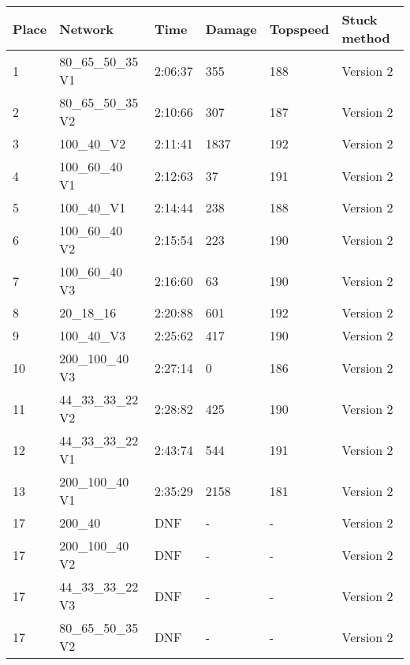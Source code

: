 \begin{table}[H]
\begin{tabular}{llllll}
 \textbf{Place} & \textbf{Network} & \textbf{Time} & \textbf{Damage} & \textbf{Topspeed}  & \textbf{Stuck method} \\ \hline
 1&  80\_65\_50\_35 V1 & 2:06:37 & 355 & 188 & Version 2 \\ \hline
 2& 80\_65\_50\_35 V2  & 2:10:66 & 307 & 187 & Version 2 \\ \hline
 3&  100\_40\_V2 & 2:11:41 & 1837 & 192 & Version 2 \\ \hline
 4& 100\_60\_40 V1 & 2:12:63 & 37 & 191 & Version 2   \\ \hline
 5&  100\_40\_V1  & 2:14:44 & 238 & 188 & Version 2 \\ \hline
 6& 100\_60\_40 V2  & 2:15:54 & 223 & 190 & Version 2 \\ \hline
 7& 100\_60\_40 V3 & 2:16:60  & 63 & 190 & Version 2   \\ \hline
 8& 20\_18\_16  & 2:20:88  & 601 & 192 & Version 2    \\
 9& 100\_40\_V3  & 2:25:62 & 417 & 190 & Version 2 \\ \hline
 10& 200\_100\_40 V3  & 2:27:14 & 0 & 186 & Version 2 \\ \hline
 11& 44\_33\_33\_22 V2  & 2:28:82 & 425 & 190 & Version 2 \\ \hline
 12& 44\_33\_33\_22 V1 & 2:43:74 & 544 & 191 & Version 2 \\ \hline
 13& 200\_100\_40 V1 & 2:35:29 & 2158 & 181 & Version 2 \\ \hline
 17&  200\_40  & DNF & - & - & Version 2   \\ \hline 
 17& 200\_100\_40 V2 & DNF & - & - & Version 2 \\  \hline
 17&  44\_33\_33\_22 V3  & DNF & - & - & Version 2 \\ \hline
 17& 80\_65\_50\_35 V2  & DNF & - & - & Version 2 \\ \hline 
\end{tabular}
\end{table}


